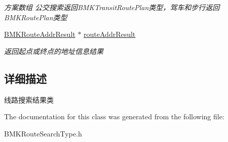 \begin{DoxyCompactItemize}
\begin{DoxyCompactList}\small\item\em 方案数组 公交搜索返回\-B\-M\-K\-Transit\-Route\-Plan类型，驾车和步行返回\-B\-M\-K\-Route\-Plan类型 \end{DoxyCompactList}\item 
\hypertarget{interface_b_m_k_plan_result_a331a15353adf3028fa747083e95f6c77}{\hyperlink{interface_b_m_k_route_addr_result}{B\-M\-K\-Route\-Addr\-Result} $\ast$ \hyperlink{interface_b_m_k_plan_result_a331a15353adf3028fa747083e95f6c77}{route\-Addr\-Result}}\label{interface_b_m_k_plan_result_a331a15353adf3028fa747083e95f6c77}

\begin{DoxyCompactList}\small\item\em 返回起点或终点的地址信息结果 \end{DoxyCompactList}\end{DoxyCompactItemize}


\subsection{详细描述}
线路搜索结果类 

The documentation for this class was generated from the following file\-:\begin{DoxyCompactItemize}
\item 
B\-M\-K\-Route\-Search\-Type.\-h\end{DoxyCompactItemize}
